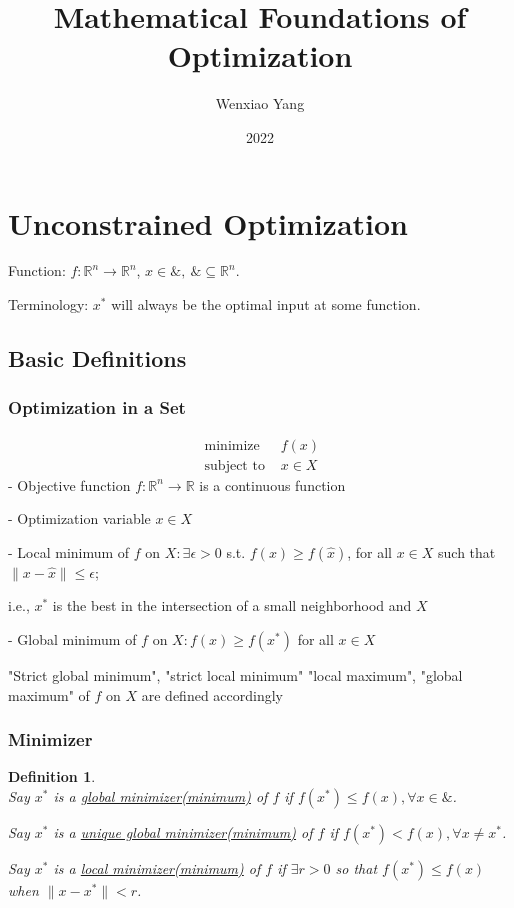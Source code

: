 \documentclass[11pt,a4paper]{article}
\title{\textbf{Mathematical Foundations of Optimization}}
\author[*]{Wenxiao Yang}
\affil[*]{Department of Mathematics, University of Illinois at Urbana-Champaign}
\date{2022}
\newtheorem{definition}{Definition}
\begin{document}
\maketitle
\tableofcontents
\newpage

\section{Unconstrained Optimization}
Function: $f:\mathbb{R}^n \rightarrow	\mathbb{R}^n$, $x\in \&,\ \&\subseteq \mathbb{R}^n$.

Terminology: $x^*$ will always be the optimal input at some function.

\subsection{Basic Definitions}
\subsubsection{Optimization in a Set}
$$\begin{array}{ll}\text { minimize } & f(x) \\ \text { subject to } & x \in X\end{array}$$
- Objective function $f: \mathbb{R}^{n} \rightarrow \mathbb{R}$ is a continuous function

- Optimization variable $x \in X$

- Local minimum of $f$ on $X: \exists \epsilon>0$ s.t. $f(x) \geq f(\hat{x})$, for all $x \in X$ such that $\|x-\hat{x}\| \leq \epsilon$;

i.e., $x^{*}$ is the best in the intersection of a small neighborhood and $X$

- Global minimum of $f$ on $X: f(x) \geq f\left(x^{*}\right)$ for all $x \in X$

"Strict global minimum", "strict local minimum" "local maximum", "global maximum" of $f$ on $X$ are defined accordingly

\subsubsection{Minimizer}
\begin{definition}
    \quad\\
    Say $x^*$ is a \underline{global minimizer(minimum)} of $f$ if $f(x^*)\leq f(x), \forall x\in \&$.

    Say $x^*$ is a \underline{unique global minimizer(minimum)} of $f$ if $f(x^*)< f(x), \forall x\neq x^*$.

    Say $x^*$ is a \underline{local minimizer(minimum)} of $f$ if $\exists r>0$ so that $f(x^*)\leq f(x)$ when $\|x-x^*\|<r$.
\end{definition}
\end{document}
